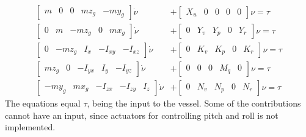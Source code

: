 \begin{align}
\begin{bmatrix}
m & 0 & 0 & mz_g & -my_g
\end{bmatrix}
\dot \nu &+
\begin{bmatrix}
X_u & 0 & 0 & 0 & 0
\end{bmatrix}
\nu = \tau\\
\begin{bmatrix}
0 & m & -mz_g & 0 & mx_g
\end{bmatrix}
\dot \nu &+
\begin{bmatrix}
0 & Y_v & Y_p & 0 & Y_r
\end{bmatrix}
\nu = \tau\\
\begin{bmatrix}
0 & -mz_g & I_x & -I_{xy} & -I_{xz}
\end{bmatrix}
\dot \nu &+
\begin{bmatrix}
0 & K_v & K_p & 0 & K_r
\end{bmatrix}
\nu = \tau\\
\begin{bmatrix}
mz_g & 0 & -I_{yx} & I_y & -I_{yz}
\end{bmatrix}
\dot \nu &+
\begin{bmatrix}
0 & 0 & 0 & M_q & 0
\end{bmatrix}
\nu = \tau\\
\begin{bmatrix}
-my_g & mx_g & -I_{zx} & -I_{zy} & I_z
\end{bmatrix}
\dot \nu &+
\begin{bmatrix}
0 & N_v & N_p & 0 & N_r
\end{bmatrix}
\nu = \tau
\end{align}
The equations equal $\tau$, being the input to the vessel. Some of the contributions cannot have an input, since actuators for controlling pitch and roll is not implemented.

